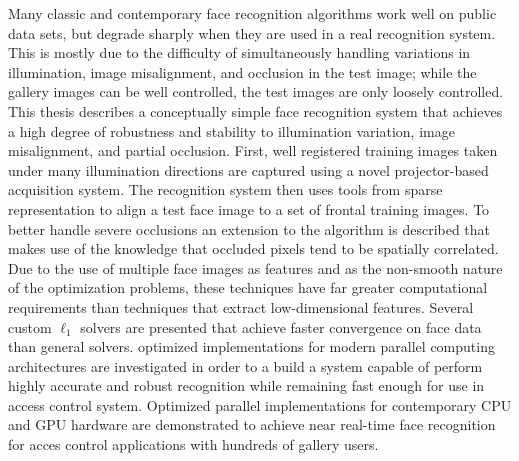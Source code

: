 Many classic and contemporary face recognition algorithms work well on public
data sets, but degrade sharply when they are used in a real recognition system.
This is mostly due to the difficulty of simultaneously handling variations in
illumination, image misalignment, and occlusion in the test image;
while the gallery images can be well controlled, the test
images are only loosely controlled.  
This thesis describes a conceptually simple face
recognition system that achieves a high degree of robustness and stability to
illumination variation, image misalignment, and partial occlusion.  First, well
registered training images taken under many illumination directions are
captured using a novel projector-based acquisition system.  The recognition
system then uses tools from sparse representation to align a test face image to
a set of frontal training images.  To better handle severe occlusions an
extension to the algorithm is described that makes use of the knowledge that
occluded pixels tend to be spatially correlated.  Due to the use of multiple
face images as features and as the non-smooth nature of the optimization
problems, these techniques have far greater computational requirements than
techniques that extract low-dimensional features.  Several custom $\ell_1$
solvers are presented that achieve faster convergence on face data than general
solvers.  optimized implementations for modern parallel computing architectures
are investigated in order to a build a system capable of perform highly
accurate and robust recognition while remaining fast enough for use in access
control system.  Optimized parallel implementations for contemporary CPU and
GPU hardware are demonstrated to achieve near real-time face recognition for
acces control applications with hundreds of gallery users.



